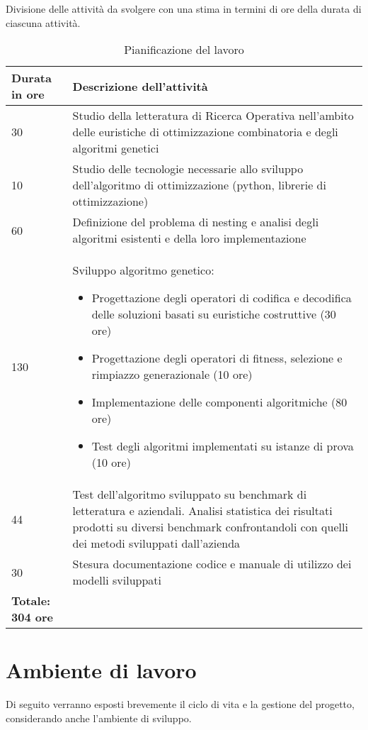 Divisione delle attività da svolgere con una stima in termini di ore della durata di ciascuna attività.\\

\begin{table}[H]
\centering
\begin{tabular}{|l|p{10cm}|}
\hline
\textbf{Durata in ore} & \textbf{Descrizione dell'attività} \\ \hline
30 & Studio della letteratura di Ricerca Operativa nell’ambito delle euristiche di ottimizzazione combinatoria e degli algoritmi genetici \\ \hline
10 & Studio delle tecnologie necessarie allo sviluppo dell’algoritmo di ottimizzazione (python, librerie di ottimizzazione) \\ \hline
60 & Definizione del problema di nesting e analisi degli algoritmi esistenti e della loro implementazione \\ \hline
130 & Sviluppo algoritmo genetico:
\begin{itemize}
    \item Progettazione degli operatori di codifica e decodifica delle soluzioni basati su euristiche costruttive (30 ore)
    \item Progettazione degli operatori di fitness, selezione e rimpiazzo generazionale (10 ore)
    \item Implementazione delle componenti algoritmiche (80 ore)
    \item Test degli algoritmi implementati su istanze di prova (10 ore)
\end{itemize} \\ \hline
44 & Test dell'algoritmo sviluppato su benchmark di letteratura e aziendali. Analisi statistica dei risultati prodotti su diversi benchmark confrontandoli con quelli dei metodi sviluppati dall'azienda \\ \hline
30 & Stesura documentazione codice e manuale di utilizzo dei modelli sviluppati \\ \hline
\textbf{Totale: 304 ore} & \\ \hline
\end{tabular}
\caption{Pianificazione del lavoro}
\end{table}

\section{Ambiente di lavoro}

Di seguito verranno esposti brevemente il ciclo di vita e la gestione del progetto, considerando anche l'ambiente di sviluppo.

